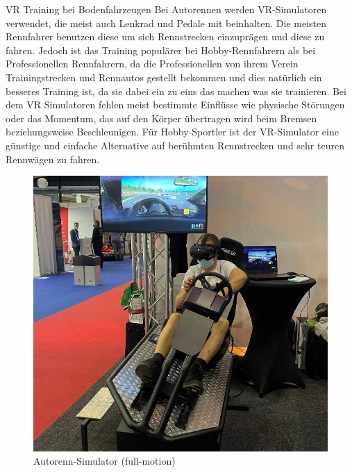 VR Training bei Bodenfahrzeugen
Bei Autorennen werden VR-Simulatoren verwendet, die meist auch Lenkrad und Pedale mit beinhalten. Die meisten Rennfahrer benutzen diese um sich Rennstrecken einzuprägen und diese zu fahren. Jedoch ist das Training populärer bei Hobby-Rennfahrern als bei Professionellen Rennfahrern, da die Professionellen von ihrem Verein Trainingstrecken und Rennautos gestellt bekommen und dies natürlich ein besseres Training ist, da sie dabei ein zu eins das machen was sie trainieren. Bei dem VR Simulatoren fehlen meist bestimmte Einflüsse wie physische Störungen oder das Momentum, das auf den Körper übertragen wird beim Bremsen beziehungsweise Beschleunigen. Für Hobby-Sportler ist der VR-Simulator eine günstige und einfache Alternative auf berühmten Rennstrecken und sehr teuren Rennwägen zu fahren. 
\\
\begin{figure}[!ht]
    \centering
    \includegraphics[width=1.0\textwidth]{images/Abbildung 2.jpg}
    \caption{\label{fig:Abbildung 2}Autorenn-Simulator (full-motion)\protect
    }
\end{figure}

